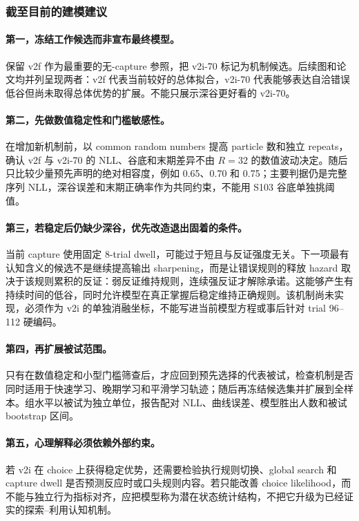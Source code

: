 \subsubsection{截至目前的建模建议}

\paragraph{第一，冻结工作候选而非宣布最终模型。}
保留 v2f 作为最重要的无-capture 参照，把 v2i-70 标记为机制候选。后续图和论文均并列呈现两者：v2f 代表当前较好的总体拟合，v2i-70 代表能够表达自洽错误低谷但尚未取得总体优势的扩展。不能只展示深谷更好看的 v2i-70。

\paragraph{第二，先做数值稳定性和门槛敏感性。}
在增加新机制前，以 common random numbers 提高 particle 数和独立 repeats，确认 v2f 与 v2i-70 的 NLL、谷底和末期差异不由 $R=32$ 的数值波动决定。随后只比较少量预先声明的绝对相容度，例如 0.65、0.70 和 0.75；主要判据仍是完整序列 NLL，深谷误差和末期正确率作为共同约束，不能用 S103 谷底单独挑阈值。

\paragraph{第三，若稳定后仍缺少深谷，优先改造退出固着的条件。}
当前 capture 使用固定 8-trial dwell，可能过于短且与反证强度无关。下一项最有认知含义的候选不是继续提高输出 sharpening，而是让错误规则的释放 hazard 取决于该规则累积的反证：弱反证维持规则，连续强反证才解除承诺。这能够产生有持续时间的低谷，同时允许模型在真正掌握后稳定维持正确规则。该机制尚未实现，必须作为 v2i 的单独消融坐标，不能写进当前模型方程或事后针对 trial 96--112 硬编码。

\paragraph{第四，再扩展被试范围。}
只有在数值稳定和小型门槛筛查后，才应回到预先选择的代表被试，检查机制是否同时适用于快速学习、晚期学习和平滑学习轨迹；随后再冻结候选集并扩展到全样本。组水平以被试为独立单位，报告配对 NLL、曲线误差、模型胜出人数和被试 bootstrap 区间。

\paragraph{第五，心理解释必须依赖外部约束。}
若 v2i 在 choice 上获得稳定优势，还需要检验执行规则切换、global search 和 capture dwell 是否预测反应时或口头规则内容。若只能改善 choice likelihood，而不能与独立行为指标对齐，应把模型称为潜在状态统计结构，不把它升级为已经证实的探索--利用认知机制。


